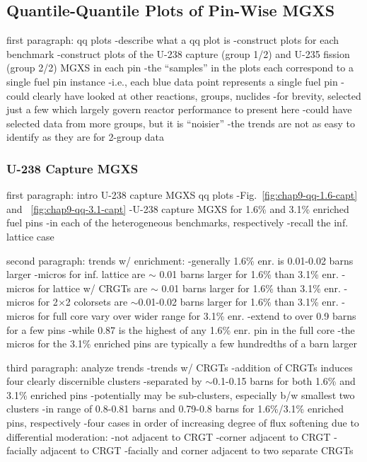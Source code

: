 \subsection{Quantile-Quantile Plots of Pin-Wise MGXS}
\label{subsec:chap9-qq-plots}

first paragraph: qq plots
-describe what a qq plot is
-construct plots for each benchmark
-construct plots of the U-238 capture (group 1/2) and U-235 fission (group 2/2) \ac{MGXS} in each pin
  -the ``samples'' in the plots each correspond to a single fuel pin instance
    -i.e., each blue data point represents a single fuel pin
-could clearly have looked at other reactions, groups, nuclides
  -for brevity, selected just a few which largely govern reactor performance to present here
  -could have selected data from more groups, but it is ``noisier''
    -the trends are not as easy to identify as they are for 2-group data

\subsubsection{U-238 Capture MGXS}
\label{subsubsec:chap9-qq-plots-capt}

first paragraph: intro U-238 capture \ac{MGXS} qq plots
-Fig.~\ref{fig:chap9-qq-1.6-capt} and ~\ref{fig:chap9-qq-3.1-capt}
  -U-238 capture \ac{MGXS} for 1.6\% and 3.1\% enriched fuel pins
  -in each of the heterogeneous benchmarks, respectively
-recall the inf. lattice case

second paragraph: trends w/ enrichment:
-generally 1.6\% enr. is 0.01-0.02 barns larger
  -micros for inf. lattice are $\sim$ 0.01 barns larger for 1.6\% than 3.1\% enr.
  -micros for lattice w/ \acp{CRGT} are $\sim$ 0.01 barns larger for 1.6\% than 3.1\% enr.
  -micros for 2$\times$2 colorsets are $\sim$0.01-0.02 barns larger for 1.6\% than 3.1\% enr.
  -micros for full core vary over wider range for 3.1\% enr.
    -extend to over 0.9 barns for a few pins
    -while 0.87 is the highest of any 1.6\% enr. pin in the full core
    -the micros for the 3.1\% enriched pins are typically a few hundredths of a barn larger 

third paragraph: analyze trends
-trends w/ \acp{CRGT}
  -addition of \acp{CRGT} induces four clearly discernible clusters
  -separated by $\sim$0.1-0.15 barns for both 1.6\% and 3.1\% enriched pins
  -potentially may be sub-clusters, especially b/w smallest two clusters
    -in range of 0.8-0.81 barns and 0.79-0.8 barns for 1.6\%/3.1\% enriched pins, respectively
  -four cases in order of increasing degree of flux softening due to differential moderation:
    -not adjacent to \ac{CRGT}
    -corner adjacent to \ac{CRGT}
    -facially adjacent to \ac{CRGT}
    -facially and corner adjacent to two separate \acp{CRGT}

